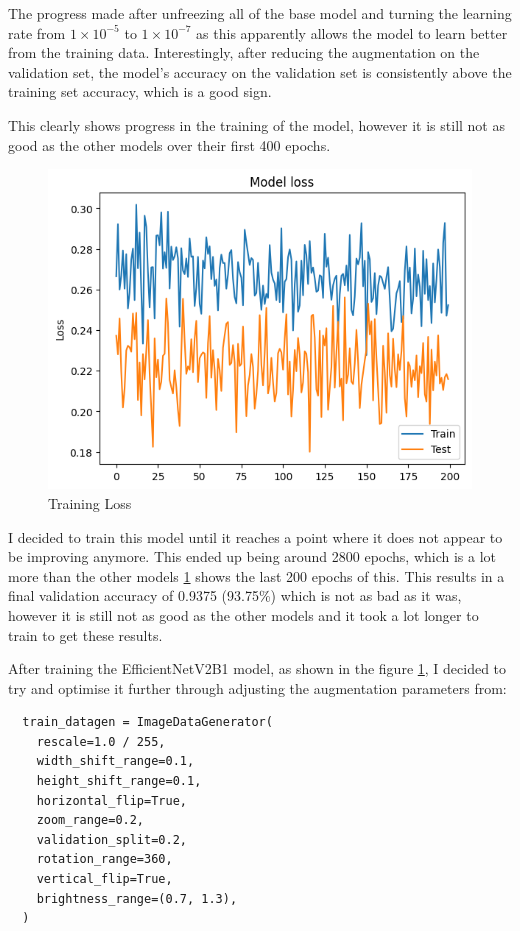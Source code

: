 \documentclass[]{final_report}
\begin{document}
The progress made after unfreezing all of the base model and turning the learning rate from $1 \times 10^{-5}$ to $1 \times 10^{-7}$ as this apparently allows the model to learn better from the training data. Interestingly, after reducing the augmentation on the validation set, the model's accuracy on the validation set is consistently above the training set accuracy, which is a good sign.

This clearly shows progress in the training of the model, however it is still not as good as the other models over their first 400 epochs. 

\begin{figure}[ht!]
  \centering
  \includegraphics[width=0.7\linewidth]{images/EfficientNetV2B1-final-training-accuracy.png}
  \caption{Training Loss}
  \label{fig:EfficientNetV2B1-final-training-loss}
\end{figure}

I decided to train this model until it reaches a point where it does not appear to be improving anymore. This ended up being around 2800 epochs, which is a lot more than the other models \ref{fig:EfficientNetV2B1-final-training-loss} shows the last 200 epochs of this. This results in a final validation accuracy of 0.9375 (93.75\%) which is not as bad as it was, however it is still not as good as the other models and it took a lot longer to train to get these results.

After training the EfficientNetV2B1 model, as shown in the figure \ref{fig:EfficientNetV2B1-final-training-loss}, I decided to try and optimise it further through adjusting the augmentation parameters from:

\begin{lstlisting}
  train_datagen = ImageDataGenerator(
    rescale=1.0 / 255,
    width_shift_range=0.1,
    height_shift_range=0.1,
    horizontal_flip=True,
    zoom_range=0.2,
    validation_split=0.2,
    rotation_range=360,
    vertical_flip=True,
    brightness_range=(0.7, 1.3),
  )
\end{lstlisting}
\end{document}
